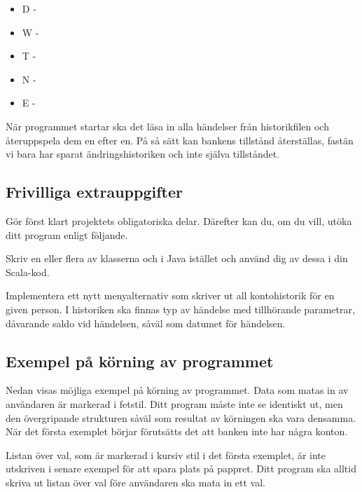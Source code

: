 \begin{itemize}
\item D - 
\item W - 
\item T - 
\item N - 
\item E - 
\end{itemize}

\Subtask När programmet startar ska det läsa in alla händelser från historikfilen och återuppspela dem en efter en. På så sätt kan bankens tillstånd återställas, fastän vi bara har sparat ändringshistoriken och inte själva tillståndet.


\subsection{Frivilliga extrauppgifter}

Gör först klart projektets obligatoriska delar. Därefter kan du, om du vill, utöka ditt program enligt följande.

\Task Skriv en eller flera av klasserna  och  i Java istället och använd dig av dessa i din Scala-kod.

\Task	Implementera ett nytt menyalternativ som skriver ut all kontohistorik för en given person. I historiken ska finnas typ av händelse med tillhörande parametrar, dåvarande saldo vid händelsen, såväl som datumet för händelsen.

\subsection{Exempel på körning av programmet}

Nedan visas möjliga exempel på körning av programmet. Data som matas in av användaren är markerad i fetstil.
Ditt program måste inte se identiskt ut, men den övergripande strukturen såväl som resultat av körningen ska vara densamma.
När det första exemplet börjar förutsätts det att banken inte har några konton.

Listan över val, som är markerad i kursiv stil i det första exemplet, är inte utskriven i senare exempel för att spara plats på pappret. Ditt program ska alltid skriva ut listan över val före användaren ska mata in ett val.

\newenvironment{exampleblock}
	{\begin{minipage}{\columnwidth}
	 - - - - - - - - - - - - - - - - - - - - - - - - - - -\\}
	{\end{minipage}}


